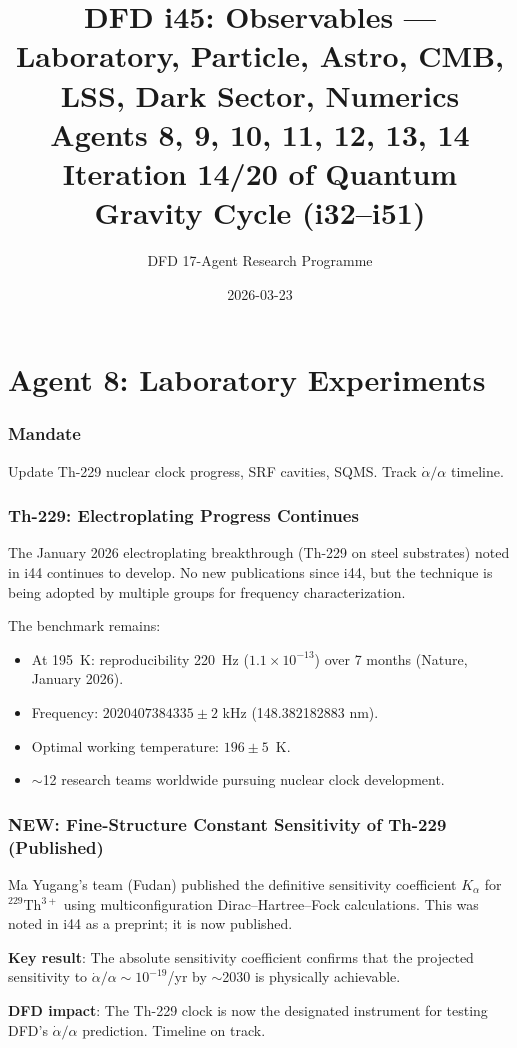 \documentclass[11pt,a4paper]{article}
\title{DFD i45: Observables --- Laboratory, Particle, Astro, CMB, LSS, Dark Sector, Numerics\\[6pt]
\large Agents 8, 9, 10, 11, 12, 13, 14\\[6pt]
\normalsize Iteration 14/20 of Quantum Gravity Cycle (i32--i51)}
\author{DFD 17-Agent Research Programme}
\date{2026-03-23}
\newcommand{\NEW}{\textcolor{dfdblue}{\textbf{NEW}}}
\begin{document}
\maketitle
\tableofcontents
\newpage

\part{Agent 8: Laboratory Experiments}
\label{part:agent8}

\section{Mandate}

Update Th-229 nuclear clock progress, SRF cavities, SQMS. Track $\dot{\alpha}/\alpha$ timeline.

\section{Th-229: Electroplating Progress Continues}

The January 2026 electroplating breakthrough (Th-229 on steel substrates) noted in i44 continues to develop. No new publications since i44, but the technique is being adopted by multiple groups for frequency characterization.

The benchmark remains:
\begin{itemize}
\item At 195~K: reproducibility 220~Hz ($1.1 \times 10^{-13}$) over 7 months (Nature, January 2026).
\item Frequency: $2020407384335 \pm 2$ kHz (148.382182883 nm).
\item Optimal working temperature: $196 \pm 5$~K.
\item $\sim$12 research teams worldwide pursuing nuclear clock development.
\end{itemize}

\section{\NEW: Fine-Structure Constant Sensitivity of Th-229 (Published)}

\begin{tcolorbox}[colback=blue!5!white, colframe=blue!60!black,
  title={Nature Communications (2025): $K_\alpha$ for Th-229 Nuclear Clock}]

Ma Yugang's team (Fudan) published the definitive sensitivity coefficient $K_\alpha$ for $^{229}$Th$^{3+}$ using multiconfiguration Dirac--Hartree--Fock calculations. This was noted in i44 as a preprint; it is now published.

\textbf{Key result}: The absolute sensitivity coefficient confirms that the projected sensitivity to $\dot{\alpha}/\alpha \sim 10^{-19}$/yr by $\sim$2030 is physically achievable.

\textbf{DFD impact}: The Th-229 clock is now the designated instrument for testing DFD's $\dot{\alpha}/\alpha$ prediction. Timeline on track.
\end{tcolorbox}
\end{document}

